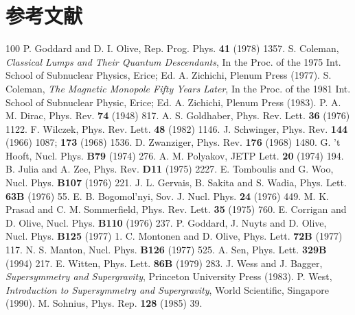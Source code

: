 \section*{参考文献}
\begin{thebibliography}{100}
P. Goddard and D. I. Olive, Rep. Prog. Phys. {\bf 41} (1978) 1357.
S. Coleman, {\it Classical Lumps and Their Quantum Descendants}, In
the Proc. of the 1975 Int. School of Subnuclear Physics, Erice;
Ed. A. Zichichi, Plenum Press (1977).  
S. Coleman, {\it The Magnetic Monopole Fifty Years Later}, In the
Proc. of the 1981 Int. School of Subnuclear Physic, Erice;
Ed. A. Zichichi, Plenum Press (1983).
P. A. M. Dirac, Phys. Rev. {\bf 74} (1948) 817.
A. S. Goldhaber, Phys. Rev. Lett. {\bf 36} (1976) 1122.
F. Wilczek, Phys. Rev. Lett. {\bf 48} (1982) 1146.
J. Schwinger, Phys. Rev. {\bf 144} (1966) 1087; {\bf 173} (1968)
1536. 
D. Zwanziger, Phys. Rev. {\bf 176} (1968) 1480.
G. 't Hooft, Nucl. Phys. {\bf B79} (1974) 276. 
A. M. Polyakov, JETP Lett. {\bf 20} (1974) 194.
B. Julia and A. Zee, Phys. Rev. {\bf D11} (1975) 2227.
E. Tomboulis and G. Woo, Nucl. Phys. {\bf B107} (1976) 221.
J. L. Gervais, B. Sakita and S. Wadia, Phys. Lett. {\bf 63B} (1976) 55. 
E. B. Bogomol'nyi, Sov. J. Nucl. Phys. {\bf 24} (1976) 449.
M. K. Prasad and C. M. Sommerfield, Phys. Rev. Lett. {\bf 35} (1975)
760. 
E. Corrigan and D. Olive, Nucl. Phys. {\bf B110} (1976) 237.
P. Goddard, J. Nuyts and D. Olive, Nucl. Phys. {\bf B125} (1977) 1.
C. Montonen and D. Olive, Phys. Lett. {\bf 72B} (1977) 117.
N. S. Manton, Nucl. Phys. {\bf B126} (1977) 525.
A. Sen, Phys. Lett. {\bf 329B} (1994) 217.
E. Witten, Phys. Lett. {\bf 86B} (1979) 283.
J. Wess and J. Bagger, {\it Supersymmetry and Supergravity}, Princeton
University Press (1983).
P. West, {\it Introduction to Supersymmetry and Supergravity}, World
Scientific, Singapore (1990).
M. Sohnius, Phys. Rep. {\bf 128} (1985) 39.

\end{thebibliography}
